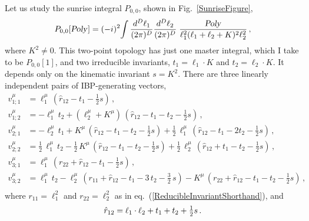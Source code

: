 \documentclass[aps,prd,preprint,groupedaddress,nofootinbib,showpacs,eqsecnum]{revtex4}
\def\fig#1{Fig.~{\ref{#1}}}
\def\eqn#1{eq.~(\ref{#1})}
\def\Pn#1#2{P_{#1,#2}}
\begin{document}
\def\F#1#2{{}_{#1}F_{#2}}
\def\rh{\hat r}
Let us study the sunrise integral $\Pn00$, shown in \fig{SunriseFigure},
\begin{equation}
\Pn00[\Poly] = (-i)^2\!\int 
\frac{d^D\ell_1}{(2\pi)^D} \frac{d^D\ell_2}{(2\pi)^D}
\;\frac{\Poly}{\ell_1^2 (\ell_1+\ell_2+K)^2
	\ell_2^2}\,,
\end{equation}  
where $K^2\neq 0$.
This two-point topology
has just one master
integral, which I take to be $\Pn00[1]$, 
and two irreducible invariants, $t_1=\ell_1\cdot K$
and $t_2=\ell_2\cdot K$.  It depends only on the kinematic invariant $s=K^2$.
There are three linearly independent pairs
of IBP-generating vectors,
\begin{equation}
\begin{aligned}
v_{1;1}^\mu &=
\ell_1^\mu\,(\rh_{12}-t_{1}-\tfrac{1}{2}s)
\,,\\
v_{1;2}^\mu &=
-\ell_1^\mu\,t_{2}
+(\ell_2^\mu+K^\mu)\,(\rh_{12}-t_{1}-t_{2}-\tfrac{1}{2}s)
\,,\\
v_{2;1}^\mu &=
-\ell_2^\mu\,t_{1}
+K^\mu\,(\rh_{12}-t_{1}-t_{2}-\tfrac{1}{2}s)
+\tfrac{1}{2}\,\ell_1^\mu\,(\rh_{12}-t_{1}-2t_{2}-\tfrac{1}{2}s)
\,,\\
v_{2;2}^\mu &=
\tfrac{1}{2}\,\ell_1^\mu\,t_{2}
-\tfrac{1}{2}\,K^\mu\,(\rh_{12}-t_{1}-t_{2}-\tfrac{1}{2}s)
+\tfrac{1}{2}\,\ell_2^\mu\,(\rh_{12}+t_{1}-t_{2}-\tfrac{1}{2}s)
\,,\\
v_{3;1}^\mu &=
\ell_1^\mu\,(r_{22}+\rh_{12}-t_{1}-\tfrac{1}{2}s)
\,,\\
v_{3;2}^\mu &=
\ell_1^\mu\,t_{2}
-\ell_2^\mu\,(r_{11}+\rh_{12}-t_{1}-3\,t_{2}-\tfrac{3}{2}\,s)
-K^\mu\,(r_{22}+\rh_{12}-t_{1}-t_{2}-\tfrac{1}{2}s)
\,,\\
\end{aligned}
\label{SunriseVectors}
\end{equation}
where $r_{11} = \ell_1^2$ and $r_{22}=\ell_2^2$ as 
in \eqn{ReducibleInvariantShorthand}, and
\begin{equation}
\rh_{12} = \ell_1\cdot \ell_2+t_1+t_2+\tfrac{1}{2} s\,.\\
\end{equation}
\end{document}

